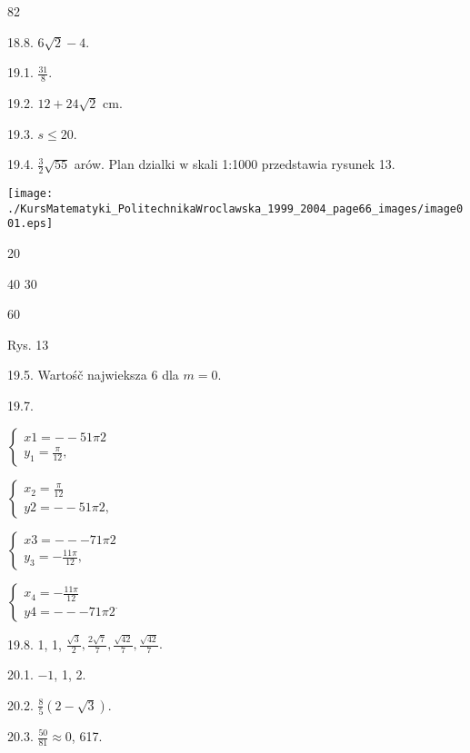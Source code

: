 \documentclass[a4paper,12pt]{article}
\begin{document}
82

18.8. $6\sqrt{2}-4.$

19.1. $\displaystyle \frac{31}{8}.$

19.2. $12+24\sqrt{2}$ cm.

19.3. $s\leq 20.$

19.4. $\displaystyle \frac{3}{2}\sqrt{55}$ arów. Plan dzialki $\mathrm{w}$ skali 1:1000 przedstawia rysunek 13.
\begin{center}
\texttt{[image: ./KursMatematyki\_PolitechnikaWroclawska\_1999\_2004\_page66\_images/image001.eps]}
\end{center}
20

40  30

60

Rys. 13

19.5. Wartośč najwieksza 6 dla $m=0.$

19.7.

$\left\{\begin{array}{l}
x1=-- 51\pi 2\\
y_{1}=\frac{\pi}{12},
\end{array}\right.$

$\left\{\begin{array}{l}
x_{2}=\frac{\pi}{12}\\
y2=-- 51\pi 2,
\end{array}\right.$

$\left\{\begin{array}{l}
x3=--- 71\pi 2\\
y_{3}=-\frac{11\pi}{12},
\end{array}\right.$

$\left\{\begin{array}{l}
x_{4}=-\frac{11\pi}{12}\\
y4=--- 71\pi 2^{\cdot}
\end{array}\right.$

19.8. 1, 1, $\displaystyle \frac{\sqrt{3}}{2}, \displaystyle \frac{2\sqrt{7}}{7}, \displaystyle \frac{\sqrt{42}}{7}, \displaystyle \frac{\sqrt{42}}{7}.$

20.1. $-1$, 1, 2.

20.2. $\displaystyle \frac{8}{5}(2-\sqrt{3}).$

20.3. $\displaystyle \frac{50}{81}\approx 0$, 617.
\end{document}
